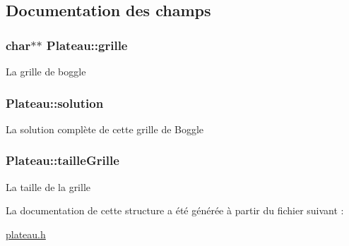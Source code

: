 \subsection{Documentation des champs}
\hypertarget{structPlateau_a42411aa44b78d298681030ce3461f686}{
\subsubsection[{grille}]{\setlength{\rightskip}{0pt plus 5cm}char$\ast$$\ast$ Plateau\-::grille}}\label{structPlateau_a42411aa44b78d298681030ce3461f686}
La grille de boggle \hypertarget{structPlateau_aed88af50891b17edcd3ba97d7098dfde}{
\subsubsection[{solution}]{ Plateau\-::solution}}\label{structPlateau_aed88af50891b17edcd3ba97d7098dfde}
La solution complète de cette grille de Boggle \hypertarget{structPlateau_af86602008c1cfce98187fd9b9b4e50ce}{
\subsubsection[{taille\-Grille}]{ Plateau\-::taille\-Grille}}\label{structPlateau_af86602008c1cfce98187fd9b9b4e50ce}
La taille de la grille 

La documentation de cette structure a été générée à partir du fichier suivant \-:\begin{DoxyCompactItemize}
\item 
\hyperlink{plateau_8h}{plateau.\-h}\end{DoxyCompactItemize}

